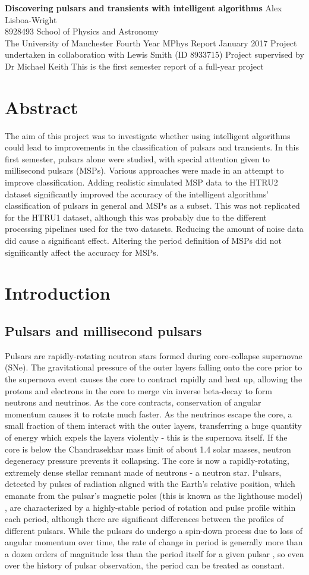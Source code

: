 \documentclass[12pt]{article}
\newcommand{\makecover}[9]{
\thispagestyle{empty}
\setcounter{page}{0}
\begin{center}\LARGE{\bf #1}\vskip 24pt \normalsize{#2}\hspace*{\fill}\\
#3\vskip 12pt School of Physics and Astronomy\\The University of Manchester\vskip 12pt #4 Year MPhys Report\vskip 12pt
#5 \vskip 12pt
#6 \vskip 12pt
#7 \vskip 12pt
#8  \end{center}\section*{Abstract}

#9\newpage}
\begin{document}

\makecover
{Discovering pulsars and transients with intelligent algorithms}
{Alex Lisboa-Wright}
{8928493}
{Fourth}
{January 2017}
{Project undertaken in collaboration with Lewis Smith (ID 8933715)}
{Project supervised by Dr Michael Keith}
{This is the first semester report of a full-year project}
{The aim of this project was to investigate whether using intelligent algorithms could lead to improvements in the classification of pulsars and transients. In this first semester, pulsars alone were studied, with special attention given to millisecond pulsars (MSPs). Various approaches were made in an attempt to improve classification. Adding realistic simulated MSP data to the HTRU2 dataset significantly improved the accuracy of the intelligent algorithms' classification of pulsars in general and MSPs as a subset. This was not replicated for the HTRU1 dataset, although this was probably due to the different processing pipelines used for the two datasets. Reducing the amount of noise data did cause a significant effect. Altering the period definition of MSPs did not significantly affect the accuracy for MSPs.}
\par
\section{Introduction}
\subsection{Pulsars and millisecond pulsars}
Pulsars are rapidly-rotating neutron stars formed during core-collapse supernovae (SNe). The gravitational pressure of the outer layers falling onto the core prior to the supernova event causes the core to contract rapidly and heat up, allowing the protons and electrons in the core to merge via inverse beta-decay to form neutrons and neutrinos. As the core contracts, conservation of angular momentum causes it to rotate much faster. As the neutrinos escape the core, a small fraction of them interact with the outer layers, transferring a huge quantity of energy which expels the layers violently - this is the supernova itself. If the core is below the Chandrasekhar mass limit of about 1.4 solar masses, neutron degeneracy pressure prevents it collapsing. The core is now a rapidly-rotating, extremely dense stellar remnant made of neutrons - a neutron star. Pulsars, detected by pulses of radiation aligned with the Earth's relative position, which emanate from the pulsar's magnetic poles (this is known as the lighthouse model) \cite{lorimer2008binary}, are characterized by a highly-stable period of rotation and pulse profile within each period, although there are significant differences between the profiles of different pulsars. While the pulsars do undergo a spin-down process due to loss of angular momentum over time, the rate of change in period is generally more than a dozen orders of magnitude less than the period itself for a given pulsar \cite{lorimer2008binary}, so even over the history of pulsar observation, the period can be treated as constant.
\end{document}
